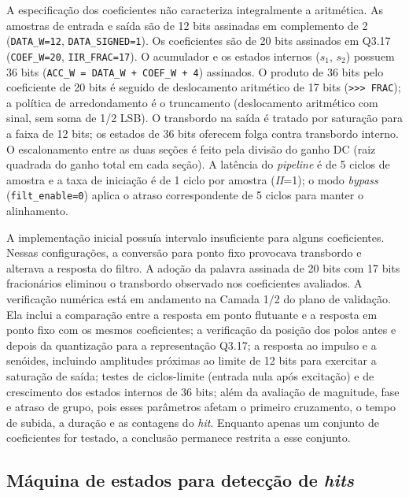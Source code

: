 A especificação dos coeficientes não caracteriza integralmente a aritmética. As amostras de entrada e saída são de 12 bits assinadas em complemento de 2 (\texttt{DATA\_W=12}, \texttt{DATA\_SIGNED=1}). Os coeficientes são de 20 bits assinados em Q3.17 (\texttt{COEF\_W=20}, \texttt{IIR\_FRAC=17}). O acumulador e os estados internos ($s_1$, $s_2$) possuem 36 bits (\texttt{ACC\_W = DATA\_W + COEF\_W + 4}) assinados. O produto de 36 bits pelo coeficiente de 20 bits é seguido de deslocamento aritmético de 17 bits (\texttt{>>> FRAC}); a política de arredondamento é o truncamento (deslocamento aritmético com sinal, sem soma de 1/2 LSB). O transbordo na saída é tratado por saturação para a faixa de 12 bits; os estados de 36 bits oferecem folga contra transbordo interno. O escalonamento entre as duas seções é feito pela divisão do ganho DC (raiz quadrada do ganho total em cada seção). A latência do \textit{pipeline} é de 5 ciclos de amostra e a taxa de iniciação é de 1 ciclo por amostra (\textit{II}=1); o modo \textit{bypass} (\texttt{filt\_enable=0}) aplica o atraso correspondente de 5 ciclos para manter o alinhamento.

A implementação inicial possuía intervalo insuficiente para alguns coeficientes. Nessas configurações, a conversão para ponto fixo provocava transbordo e alterava a resposta do filtro. A adoção da palavra assinada de 20 bits com 17 bits fracionários eliminou o transbordo observado nos coeficientes avaliados. A verificação numérica está em andamento na Camada 1/2 do plano de validação. Ela inclui a comparação entre a resposta em ponto flutuante e a resposta em ponto fixo com os mesmos coeficientes; a verificação da posição dos polos antes e depois da quantização para a representação Q3.17; a resposta ao impulso e a senóides, incluindo amplitudes próximas ao limite de 12 bits para exercitar a saturação de saída; testes de ciclos-limite (entrada nula após excitação) e de crescimento dos estados internos de 36 bits; além da avaliação de magnitude, fase e atraso de grupo, pois esses parâmetros afetam o primeiro cruzamento, o tempo de subida, a duração e as contagens do \textit{hit}. Enquanto apenas um conjunto de coeficientes for testado, a conclusão permanece restrita a esse conjunto.

\subsection{Máquina de estados para detecção de \textit{hits}}
\label{v2:subsec:maquina_estados_hit}

